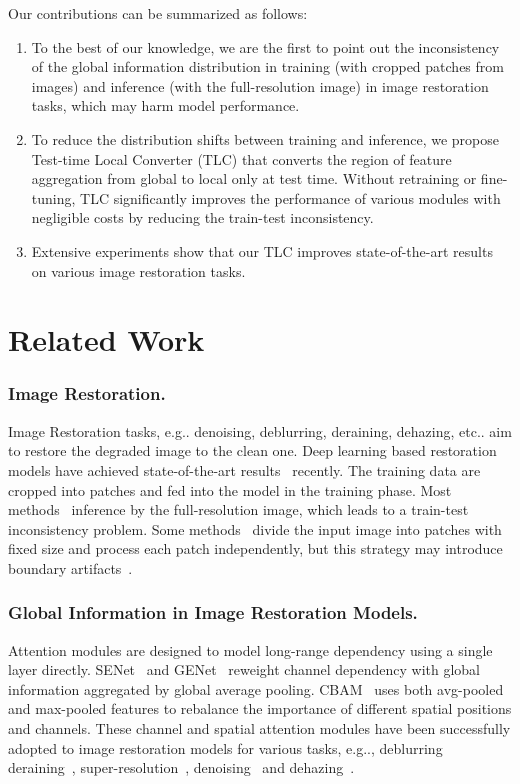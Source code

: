 \documentclass[runningheads]{llncs}
\makeatletter
\DeclareRobustCommand\onedot{\futurelet\@let@token\@onedot}
\def\@onedot{\ifx\@let@token.\else.\null\fi\xspace}
\def\eg{e.g\onedot}
\def\etc{etc\onedot}
\makeatother
\begin{document}
Our contributions can be summarized as follows:
\begin{enumerate}
   \item To the best of our knowledge, we are the first to point out the inconsistency of the global information distribution in training (with cropped patches from images) and inference (with the full-resolution image) in image restoration tasks, which may harm model performance.

   \item To reduce the distribution shifts between training and inference, we propose Test-time Local Converter (TLC) that converts the region of feature aggregation from global to local only at test time. 
   Without retraining or fine-tuning, TLC significantly improves the performance of various modules with negligible costs by reducing the train-test inconsistency.
   
   \item Extensive experiments show that our TLC improves state-of-the-art results on various image restoration tasks.
\end{enumerate}
 \section{Related Work}
\subsubsection{Image Restoration.}
Image Restoration tasks, \eg denoising, deblurring, deraining, dehazing, \etc aim to restore the degraded image to the clean one. Deep learning based restoration models have achieved state-of-the-art results~\cite{fang2020multi,Zamir2021MPRNet,chen2021hinet,zamir2021restormer} recently. The training data are cropped into patches and fed into the model in the training phase. Most methods~\cite{qin2020ffa,fang2020multi,Zamir2021MPRNet} inference by the full-resolution image, which leads to a train-test inconsistency problem. Some methods~\cite{chen2021hinet,chen2021pre} divide the input image into patches with fixed size and process each patch independently, but this strategy may introduce boundary artifacts~\cite{lee2015block,liang2021swinir}.

\subsubsection{Global Information in Image Restoration Models.}
Attention modules are designed to model long-range dependency using a single layer directly. SENet~\cite{hu2018squeeze} and GENet~\cite{hu2018gather} reweight channel dependency with global information aggregated by global average pooling. CBAM~\cite{woo2018cbam} uses both avg-pooled and max-pooled features to rebalance the importance of different spatial positions and channels.
These channel and spatial attention modules have been successfully adopted to image restoration models for various tasks, \eg, deblurring~\cite{suin2020spatially,Zamir2021MPRNet,chen2022simple} deraining~\cite{li2018recurrent,fang2020multi}, super-resolution~\cite{zhang2018image,chu2022nafssr},  denoising~\cite{anwar2019real,Zamir2020CycleISP,zamir2021restormer} and dehazing~\cite{qin2020ffa}. 
\end{document}

